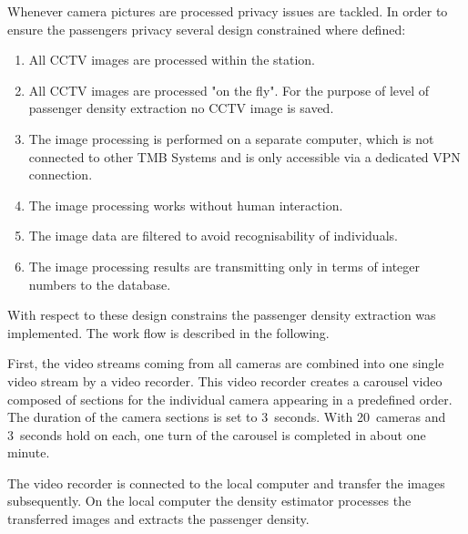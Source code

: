 Whenever camera pictures are processed privacy issues are tackled. In order to ensure the passengers privacy several design constrained where defined:

\begin{enumerate}
  \item All CCTV images are processed within the station.
      \item All CCTV images are processed "on the fly". For the purpose of level of passenger density extraction no CCTV image is saved.
  \item The image processing is performed on a separate computer, which is not connected to other TMB Systems and is only accessible via a dedicated VPN connection.
  \item The image processing works without human interaction.
  \item The image data are filtered to avoid recognisability of individuals.
  \item The image processing results are transmitting only in terms of integer numbers to the database.
\end{enumerate}

With respect to these design constrains the passenger density extraction was implemented. The work flow is described in the following.

First, the video streams coming from all cameras are combined into one single video stream by a video recorder. This video recorder creates a carousel video composed of sections for the individual camera appearing in a predefined order. The duration of the camera sections is set to 3~seconds. With 20~cameras and 3~seconds hold on each, one turn of the carousel is completed in about one minute.

The video recorder is connected to the local computer and transfer the images subsequently. On the local computer the density estimator processes the transferred images and extracts the passenger density.


